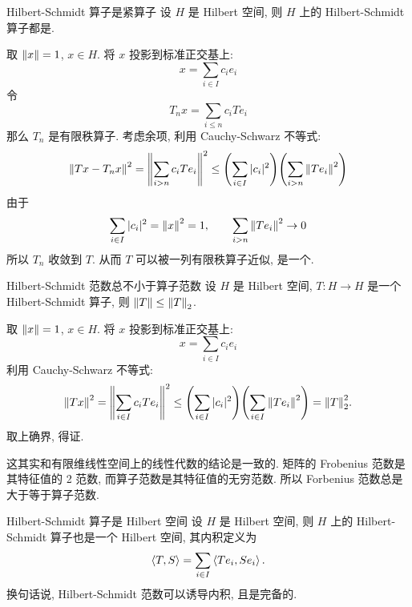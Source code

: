         \begin{thm}
            {Hilbert-Schmidt 算子是紧算子}
            设 \(H\) 是 Hilbert 空间, 则 \(H\) 上的 Hilbert-Schmidt 算子都是\CompactOp{}.
        \end{thm}

        \begin{prf}
            取 \(\norm{x}=1\), \(x\in H\). 将 \(x\) 投影到标准正交基上:
            \[x=\sum_{i\in I}c_ie_i\]
            令
            \[T_nx=\sum_{i\leq n}c_iTe_i\]
            那么 \(T_n\) 是有限秩算子. 考虑余项, 利用 Cauchy-Schwarz 不等式:
            \[\norm{Tx-T_nx}^2 = \norm{\sum_{i>n}c_iTe_i}^2\leq\qty(\sum_{i\in I}|c_i|^2)\qty(\sum_{i>n}\norm{Te_i}^2)\]
            由于
            \[\sum_{i\in I}|c_i|^2=\norm{x}^2=1, \qquad \sum_{i>n}\norm{Te_i}^2\to 0\]
            所以 \(T_n\) 收敛到 \(T\). 从而 \(T\) 可以被一列有限秩算子近似, 是一个\CompactOp{}.
        \end{prf}

        \begin{thm}
            {Hilbert-Schmidt 范数总不小于算子范数}
            设 \(H\) 是 Hilbert 空间, \(T: H \to H\) 是一个 Hilbert-Schmidt 算子, 则 \(\norm{T}\leq\norm{T}_2\).
        \end{thm}

        \begin{prf}
            取 \(\norm{x}=1\), \(x\in H\). 将 \(x\) 投影到标准正交基上:
            \[x=\sum_{i\in I}c_ie_i\]
            利用 Cauchy-Schwarz 不等式:
            \[\norm{Tx}^2 = \norm{\sum_{i\in I}c_iTe_i}^2\leq\qty(\sum_{i\in I}|c_i|^2)\qty(\sum_{i\in I}\norm{Te_i}^2)=\norm{T}_2^2.\]
            取上确界, 得证.
        \end{prf}

        \begin{rmk}
            [Dedicatia]
            这其实和有限维线性空间上的线性代数的结论是一致的. 矩阵的 Frobenius 范数是其特征值的 2 范数, 而算子范数是其特征值的无穷范数. 所以 Forbenius 范数总是大于等于算子范数.
        \end{rmk}
        
        \begin{thm}
            {Hilbert-Schmidt 算子是 Hilbert 空间}
            设 \(H\) 是 Hilbert 空间, 则 \(H\) 上的 Hilbert-Schmidt 算子也是一个 Hilbert 空间, 其内积定义为
            \[\expval{T, S} = \sum_{i\in I} \expval{Te_i, Se_i}.\]
            换句话说, Hilbert-Schmidt 范数可以诱导内积, 且是完备的.
        \end{thm}

